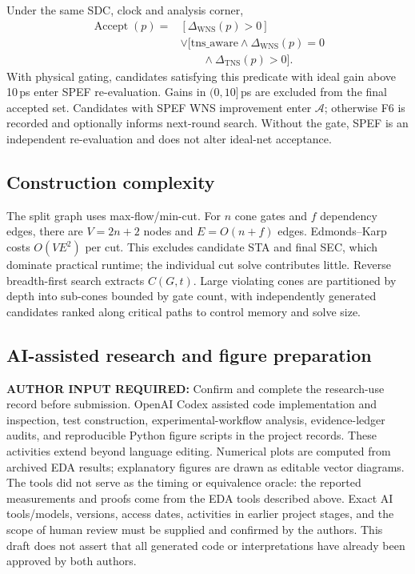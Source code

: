 \documentclass[preprint,12pt]{elsarticle}
\newcommand{\AuthorInput}[1]{\textbf{AUTHOR INPUT REQUIRED:} #1}
\begin{document}
Under the same SDC, clock and analysis corner,
\begin{equation}\label{eq:accept}
\begin{aligned}
\operatorname{Accept}(p)={}&[\Delta_{\mathrm{WNS}}(p)>0]\\
&\lor[\mathrm{tns\_aware}\land\Delta_{\mathrm{WNS}}(p)=0\\
&\qquad\land\Delta_{\mathrm{TNS}}(p)>0].
\end{aligned}
\end{equation}
With physical gating, candidates satisfying this predicate with ideal gain above 10\,ps enter SPEF re-evaluation. Gains in $(0,10]$\,ps are excluded from the final accepted set. Candidates with SPEF WNS improvement enter $\mathcal A$; otherwise F6 is recorded and optionally informs next-round search. Without the gate, SPEF is an independent re-evaluation and does not alter ideal-net acceptance.

\subsection{Construction complexity}\label{sec:impl}
The split graph uses max-flow/min-cut. For $n$ cone gates and $f$ dependency edges, there are $V=2n+2$ nodes and $E=O(n+f)$ edges. Edmonds--Karp costs $O(VE^2)$ per cut. This excludes candidate STA and final SEC, which dominate practical runtime; the individual cut solve contributes little. Reverse breadth-first search extracts $C(G,t)$. Large violating cones are partitioned by depth into sub-cones bounded by gate count, with independently generated candidates ranked along critical paths to control memory and solve size.

\subsection{AI-assisted research and figure preparation}
\AuthorInput{Confirm and complete the research-use record before submission.} OpenAI Codex assisted code implementation and inspection, test construction, experimental-workflow analysis, evidence-ledger audits, and reproducible Python figure scripts in the project records. These activities extend beyond language editing. Numerical plots are computed from archived EDA results; explanatory figures are drawn as editable vector diagrams. The tools did not serve as the timing or equivalence oracle: the reported measurements and proofs come from the EDA tools described above. Exact AI tools/models, versions, access dates, activities in earlier project stages, and the scope of human review must be supplied and confirmed by the authors. This draft does not assert that all generated code or interpretations have already been approved by both authors.
\end{document}
